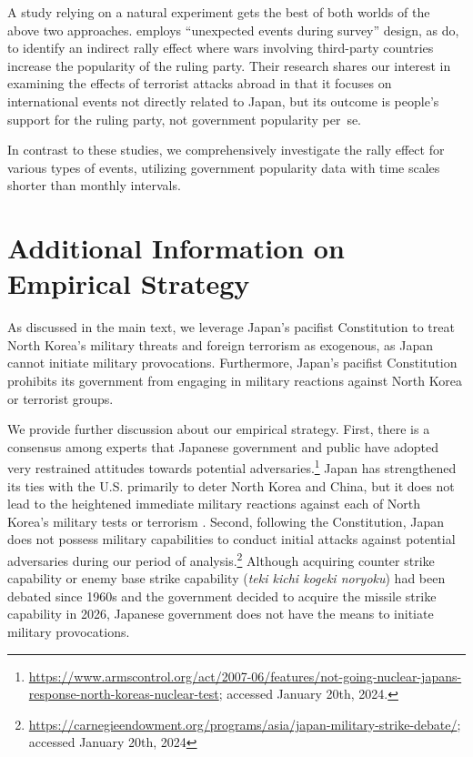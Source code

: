 \documentclass[12pt,letterpaper]{scrartcl}
\let\oldfootnote\footnote
\renewcommand\footnote[1]{\oldfootnote{\hspace{2mm}#1}}
\begin{document}
A study relying on a natural experiment gets the best of both worlds of the above two approaches. \citet{fukumoto2023} employs ``unexpected events during survey'' design, as \citet{seo2023} do, to identify an indirect rally effect where wars involving third-party countries increase the popularity of the ruling party. Their research shares our interest in examining the effects of terrorist attacks abroad in that it focuses on international events not directly related to Japan, but its outcome is people's support for the ruling party, not government popularity per~se.

In contrast to these studies, we comprehensively investigate the rally effect for various types of events, utilizing government popularity data with time scales shorter than monthly intervals.

\section{Additional Information on Empirical Strategy}\label{app:sec:japan}

As discussed in the main text, we leverage Japan's pacifist Constitution to treat North Korea's military threats and foreign terrorism as exogenous, as Japan cannot initiate military provocations. Furthermore, Japan's pacifist Constitution prohibits its government from engaging in military reactions against North Korea or terrorist groups.

We provide further discussion about our empirical strategy. First, there is a consensus among experts that Japanese government and public have adopted very restrained attitudes towards potential adversaries.\footnote{\href{https://www.armscontrol.org/act/2007-06/features/not-going-nuclear-japans-response-north-koreas-nuclear-test}{https://www.armscontrol.org/act/2007-06/features/not-going-nuclear-japans-response-north-koreas-nuclear-test}; accessed January 20th, 2024.} Japan has strengthened its ties with the U.S. primarily to deter North Korea and China, but it does not lead to the heightened immediate military reactions against each of North Korea's military tests or terrorism \citep{izumi2007,izumikawa2017}. Second, following the Constitution, Japan does not possess military capabilities to conduct initial attacks against potential adversaries during our period of analysis.\footnote{\url{https://carnegieendowment.org/programs/asia/japan-military-strike-debate/}; accessed January 20th, 2024} Although acquiring counter strike capability or enemy base strike capability (\textit{teki kichi kogeki noryoku}) had been debated since 1960s and the government decided to acquire the missile strike capability in 2026, Japanese government does not have the means to initiate military provocations.
\end{document}
